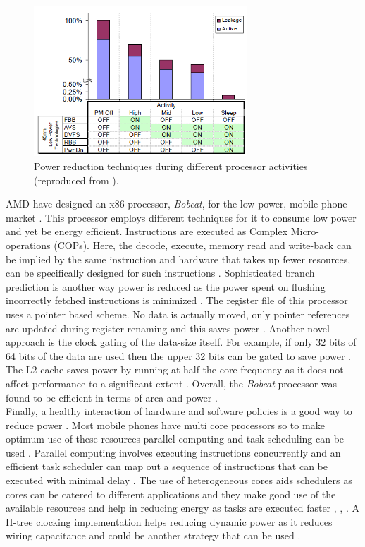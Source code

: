 \documentclass[journal]{IEEEtran}
\begin{document}
	\begin{figure}[h]
	   \centering
	   \includegraphics[width = 8cm]{ABBTech}
	   \caption{Power reduction techniques during different processor activities (reproduced from \cite{ABB}).}
	   \label{Figure:ABBTech}
	\end{figure}	
	\FloatBarrier
	
AMD have designed an x86 processor, \textit{Bobcat}, for the low power, mobile phone market \cite{AMD}. This processor employs different techniques for it to consume low power and yet be energy efficient. Instructions are executed as Complex Micro-operations (COPs). Here, the decode, execute, memory read and write-back can be implied by the same instruction and hardware that takes up fewer resources, can be specifically designed for such instructions \cite{AMD}. Sophisticated branch prediction is another way power is reduced as the power spent on flushing incorrectly fetched instructions is minimized \cite{AMD}. The register file of this processor uses a pointer based scheme. No data is actually moved, only pointer references are updated during register renaming and this saves power \cite{AMD}. Another novel approach is the clock gating of the data-size itself. For example, if only 32 bits of 64 bits of the data are used then the upper 32 bits can be gated to save power \cite{AMD}. The L2 cache saves power by running at half the core frequency as it does not affect performance to a significant extent \cite{AMD}. Overall, the \textit{Bobcat} processor was found to be efficient in terms of area and power \cite{AMD}. \\

Finally, a healthy interaction of hardware and software policies is a good way to reduce power \cite{HD/SF}. Most mobile phones have multi core processors so to make optimum use of these resources parallel computing and task scheduling can be used \cite{HD/SF}. Parallel computing involves executing instructions concurrently and an efficient task scheduler can map out a sequence of instructions that can be executed with minimal delay \cite{HD/SF}. The use of heterogeneous cores aids schedulers as cores can be catered to different applications and they make good use of the available resources and help in reducing energy as tasks are executed faster \cite{HD/SF}, \cite{Heterogeneous}, \cite{HeterogenousFuture}. A H-tree clocking implementation helps reducing dynamic power as it reduces wiring capacitance and could be another strategy that can be used \cite{Heterogeneous}.
\end{document}
